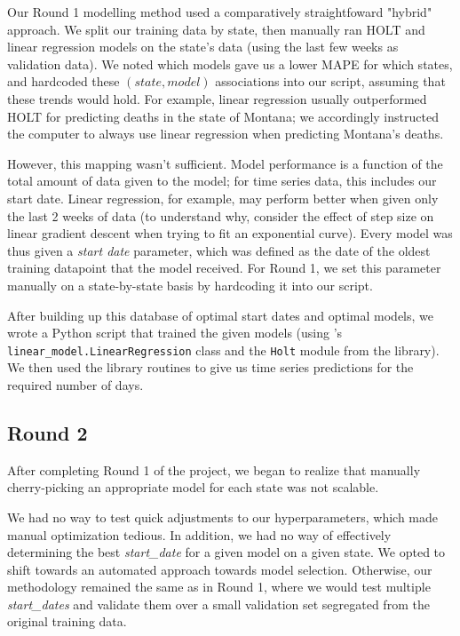 \documentclass[sigconf,nonacm]{acmart}
\begin{document}
Our Round 1 modelling method used a comparatively straightfoward "hybrid"
approach. We split our training data by state, then manually ran HOLT and
linear regression models on the state's data (using the last few weeks as
validation data). We noted which models gave us a lower MAPE for which states,
and hardcoded these $(state, model)$ associations into our script, assuming
that these trends would hold. For example, linear regression usually
outperformed HOLT for predicting deaths in the state of Montana; we accordingly
instructed the computer to always use linear regression when predicting
Montana's deaths. 

However, this mapping wasn't sufficient. 
Model performance is a function of the total amount of data given to the model;
for time series data, this includes our start date. Linear regression, for
example, may perform better when given only the last 2 weeks of data (to
understand why, consider the effect of step size on linear gradient descent
when trying to fit an exponential curve). 
Every model was thus given a \emph{start date} parameter, which was defined as
the date of the oldest training datapoint that the model received. 
For Round 1, we set this parameter manually on a state-by-state basis by
hardcoding it into our script. 

After building up this database of optimal start dates and optimal models, we
wrote a Python script that trained the given models (using \cite{scikit-learn}'s
\texttt{linear\_model.LinearRegression} class and the \texttt{Holt} module from
the \cite{statsmodels} library). We then used the library routines to give us
time series predictions for the required number of days. 

\subsection{Round 2}

After completing Round 1 of the project, we began to realize that manually
cherry-picking an appropriate model for each state was not scalable. 

We had no way to test quick adjustments to our hyperparameters, which made
manual optimization tedious. In addition, we had no way of effectively
determining the best \emph{start\_date} for a given model on a given state. 
We opted to shift towards an automated approach towards model selection. 
Otherwise, our methodology remained the same as in Round 1, where we would test
multiple \emph{start\_dates} and validate them over a small validation set
segregated from the original training data.
\end{document}
